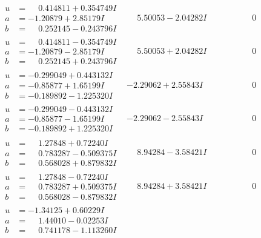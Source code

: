 \documentclass[1p]{elsarticle_modified}
\theoremstyle{definition}
\begin{document}
$$\begin{array}{c|c|c}
\begin{aligned}
u &= \phantom{-}0.414811 + 0.354749 I \\
a &= -1.20879 + 2.85179 I \\
b &= \phantom{-}0.252145 - 0.243796 I\end{aligned}
 & \phantom{-}5.50053 - 2.04282 I & \phantom{-0.000000 } 0 \\ \hline\begin{aligned}
u &= \phantom{-}0.414811 - 0.354749 I \\
a &= -1.20879 - 2.85179 I \\
b &= \phantom{-}0.252145 + 0.243796 I\end{aligned}
 & \phantom{-}5.50053 + 2.04282 I & \phantom{-0.000000 } 0 \\ \hline\begin{aligned}
u &= -0.299049 + 0.443132 I \\
a &= -0.85877 + 1.65199 I \\
b &= -0.189892 - 1.225320 I\end{aligned}
 & -2.29062 + 2.55843 I & \phantom{-0.000000 } 0 \\ \hline\begin{aligned}
u &= -0.299049 - 0.443132 I \\
a &= -0.85877 - 1.65199 I \\
b &= -0.189892 + 1.225320 I\end{aligned}
 & -2.29062 - 2.55843 I & \phantom{-0.000000 } 0 \\ \hline\begin{aligned}
u &= \phantom{-}1.27848 + 0.72240 I \\
a &= \phantom{-}0.783287 - 0.509375 I \\
b &= \phantom{-}0.568028 + 0.879832 I\end{aligned}
 & \phantom{-}8.94284 - 3.58421 I & \phantom{-0.000000 } 0 \\ \hline\begin{aligned}
u &= \phantom{-}1.27848 - 0.72240 I \\
a &= \phantom{-}0.783287 + 0.509375 I \\
b &= \phantom{-}0.568028 - 0.879832 I\end{aligned}
 & \phantom{-}8.94284 + 3.58421 I & \phantom{-0.000000 } 0 \\ \hline\begin{aligned}
u &= -1.34125 + 0.60229 I \\
a &= \phantom{-}1.44010 - 0.02253 I \\
b &= \phantom{-}0.741178 - 1.113260 I\end{aligned}

\end{array}$$
\end{document}
